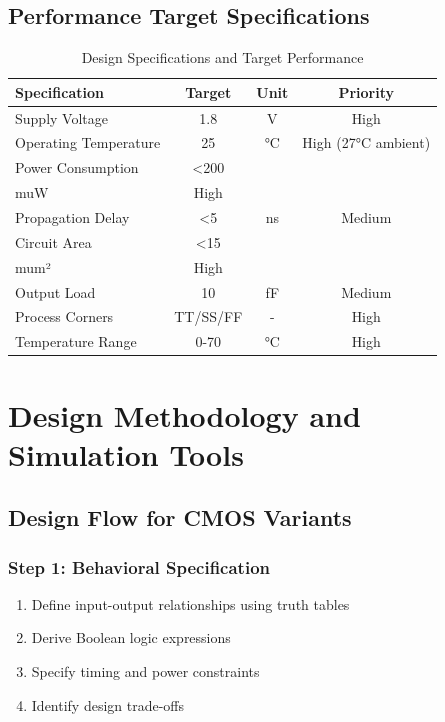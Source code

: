 \documentclass[12pt,a4paper,twoside]{report}
\begin{document}
\begin{appendices}
\section{Performance Target Specifications}

\begin{table}[H]
\centering
\caption{Design Specifications and Target Performance}
\label{tab:target_specs}
\begin{tabularx}{\textwidth}{lccc}
\toprule
Specification & Target & Unit & Priority \\
\midrule
Supply Voltage & 1.8 & V & High \\
Operating Temperature & 25 & °C & High (27°C ambient) \\
Power Consumption & <200 & \\muW & High \\
Propagation Delay & <5 & ns & Medium \\
Circuit Area & <15 & \\mum² & High \\
Output Load & 10 & fF & Medium \\
Process Corners & TT/SS/FF & - & High \\
Temperature Range & 0-70 & °C & High \\
\bottomrule
\end{tabularx}
\end{table}

\chapter{Design Methodology and Simulation Tools}
\label{app:methodology}

\section{Design Flow for CMOS Variants}

\subsection{Step 1: Behavioral Specification}

\begin{enumerate}
    \item Define input-output relationships using truth tables
    \item Derive Boolean logic expressions
    \item Specify timing and power constraints
    \item Identify design trade-offs
\end{enumerate}


\end{appendices}
\end{document}
